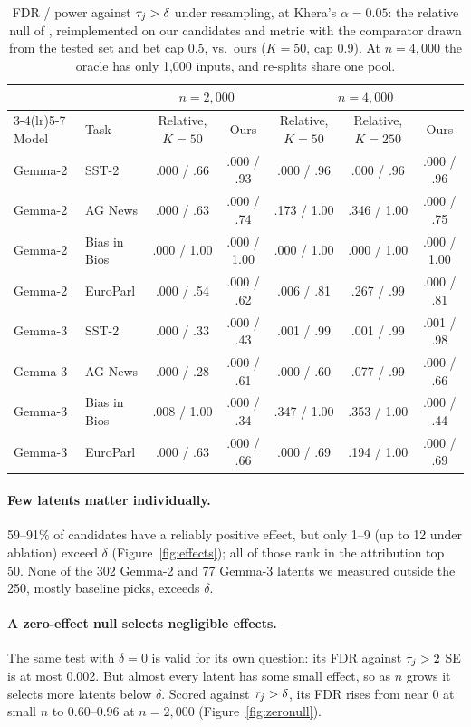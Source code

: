 \begin{table}[t]
\centering
\small
\setlength{\tabcolsep}{4pt}
\begin{tabular}{llccccc}
\toprule
 & & \multicolumn{2}{c}{$n = 2{,}000$} & \multicolumn{3}{c}{$n = 4{,}000$} \\
\cmidrule(lr){3-4}\cmidrule(lr){5-7}
Model & Task & Relative, $K{=}50$ & Ours & Relative, $K{=}50$ & Relative, $K{=}250$ & Ours \\
\midrule
Gemma-2 & SST-2 & .000 / .66 & .000 / .93 & .000 / .96 & .000 / .96 & .000 / .96 \\
Gemma-2 & AG News & .000 / .63 & .000 / .74 & .173 / 1.00 & .346 / 1.00 & .000 / .75 \\
Gemma-2 & Bias in Bios & .000 / 1.00 & .000 / 1.00 & .000 / 1.00 & .000 / 1.00 & .000 / 1.00 \\
Gemma-2 & EuroParl & .000 / .54 & .000 / .62 & .006 / .81 & .267 / .99 & .000 / .81 \\
Gemma-3 & SST-2 & .000 / .33 & .000 / .43 & .001 / .99 & .001 / .99 & .001 / .98 \\
Gemma-3 & AG News & .000 / .28 & .000 / .61 & .000 / .60 & .077 / .99 & .000 / .66 \\
Gemma-3 & Bias in Bios & .008 / 1.00 & .000 / .34 & .347 / 1.00 & .353 / 1.00 & .000 / .44 \\
Gemma-3 & EuroParl & .000 / .63 & .000 / .66 & .000 / .69 & .194 / 1.00 & .000 / .69 \\
\bottomrule
\end{tabular}
\caption{FDR / power against $\tau_j > \delta$ under resampling, at Khera's $\alpha = 0.05$: the relative null of
\citet{khera2026}, reimplemented on our candidates and metric with the comparator drawn from the tested set and
bet cap 0.5, vs.\ ours ($K = 50$, cap 0.9). At $n = 4{,}000$ the oracle has only 1,000 inputs, and re-splits share one pool.}
\label{tab:khera}
\end{table}

\paragraph{Few latents matter individually.} 59--91\% of candidates have a reliably positive effect, but
only 1--9 (up to 12 under ablation) exceed $\delta$ (Figure~\ref{fig:effects}); all of those rank in the attribution top 50. None of the 302 Gemma-2 and 77 Gemma-3 latents we measured outside the 250, mostly baseline picks, exceeds $\delta$.

\paragraph{A zero-effect null selects negligible effects.} The same test with $\delta = 0$ is valid for its own question: its FDR against $\tau_j > 2$ SE is at most 0.002. But almost every latent has some small effect, so as $n$ grows it selects more latents below $\delta$. Scored against $\tau_j > \delta$, its FDR rises from near 0 at small $n$ to 0.60--0.96 at $n = 2{,}000$ (Figure~\ref{fig:zeronull}).

